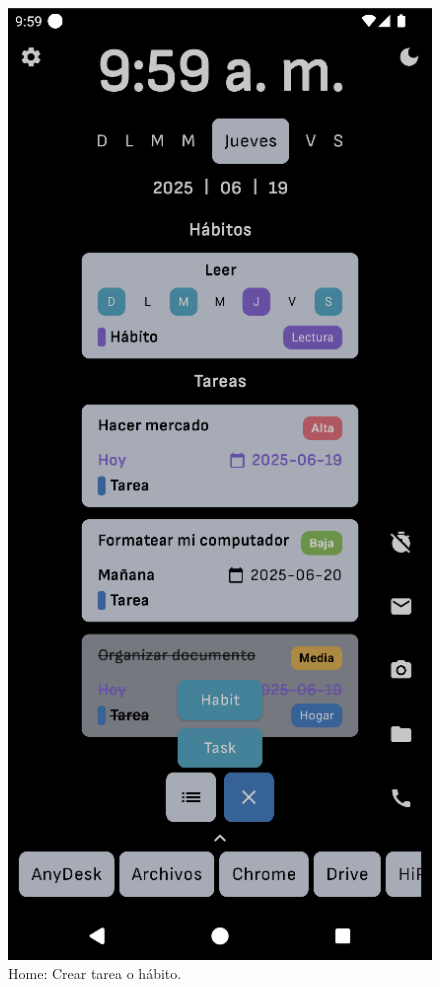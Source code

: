 \begin{figure}[ht]
\begin{minipage}{0.43\textwidth}
  \end{minipage}\hspace{0.05\textwidth}
  \begin{minipage}{0.43\textwidth}
    \caption{Home: Crear tarea o hábito.}
    \label{fig:home:crear_tarea_habito}
    \includegraphics[width=\textwidth]{Figuras/secciones/home_2.png}
    \centering
  \end{minipage}
\end{figure}

